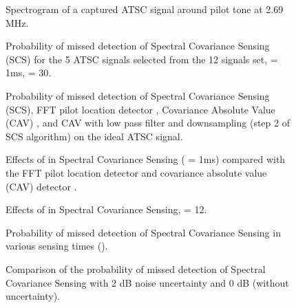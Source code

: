 \documentclass[draftclsnofoot,onecolumn,12pt]{IEEEtran}
\begin{document}
\begin{figure}[p]
  \centering
{}
  \caption{Spectrogram of a captured ATSC signal around pilot tone at 2.69 MHz.}
  \label{fig:ATSCspectrum}
\end{figure}


\begin{figure}[p]
  \centering
{}
  \caption{Probability of missed detection of Spectral Covariance Sensing (SCS) for the 5 ATSC signals selected from the 12 signals set,  = 1ms,  = 30.}
  \label{fig:SCS_Nd30_ts1_rho0}
\end{figure}


\begin{figure}[p]
  \centering
  \caption{Probability of missed detection of Spectral Covariance Sensing (SCS), FFT pilot location detector \cite{CorGho07}, Covariance Absolute Value (CAV) \cite{ZenLia09}, and CAV with low pass filter and downsampling (step 2 of SCS algorithm) on the ideal ATSC signal.}
  \label{fig:cleanATSC}
\end{figure}

\begin{figure}[p]
  \centering
{}
  \caption{Effects of  in Spectral Covariance Sensing ( = 1ms) compared with the FFT pilot location detector \cite{CorGho07} and covariance absolute value (CAV) detector \cite{ZenLia09}.} \label{fig:SCS_Nd_ts1_rho0}
\end{figure}

\begin{figure}[p]
  \centering
{}
  \caption{Effects of  in Spectral Covariance Sensing,  = 12.} \label{fig:SCS_ts_Nd30_rho0}
\end{figure}


\begin{figure}[p]
  \centering
{}
  \caption{Probability of missed detection of Spectral Covariance Sensing in various sensing times ().} \label{fig:SCS_tsxNd_rho0}
\end{figure}

\begin{figure}[p]
  \centering
{}
  \caption{Comparison of the probability of missed detection of Spectral Covariance Sensing with 2 dB noise uncertainty and 0 dB (without uncertainty).} \label{fig:SCS_rho0vs2}
\end{figure}
\end{document}
